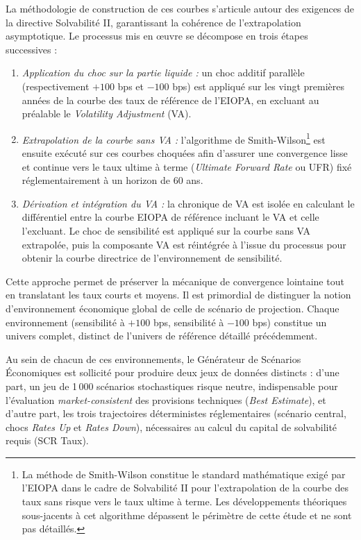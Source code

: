 La méthodologie de construction de ces courbes s'articule autour des exigences de la directive Solvabilité II, garantissant la cohérence de l'extrapolation asymptotique. Le processus mis en œuvre se décompose en trois étapes successives :
\begin{enumerate}
    \item \textit{Application du choc sur la partie liquide :} un choc additif parallèle (respectivement $+100$ bps et $-100$ bps) est appliqué sur les vingt premières années de la courbe des taux de référence de l'EIOPA, en excluant au préalable le \textit{Volatility Adjustment} (VA).
    \item \textit{Extrapolation de la courbe sans VA :} l'algorithme de Smith-Wilson\footnote{La méthode de Smith-Wilson constitue le standard mathématique exigé par l'EIOPA dans le cadre de Solvabilité II pour l'extrapolation de la courbe des taux sans risque vers le taux ultime à terme. Les développements théoriques sous-jacents à cet algorithme dépassent le périmètre de cette étude et ne sont pas détaillés.} est ensuite exécuté sur ces courbes choquées afin d'assurer une convergence lisse et continue vers le taux ultime à terme (\textit{Ultimate Forward Rate} ou UFR) fixé réglementairement à un horizon de 60 ans.
    \item \textit{Dérivation et intégration du VA :} la chronique de VA est isolée en calculant le différentiel entre la courbe EIOPA de référence incluant le VA et celle l'excluant. Le choc de sensibilité est appliqué sur la courbe sans VA extrapolée, puis la composante VA est réintégrée à l'issue du processus pour obtenir la courbe directrice de l'environnement de sensibilité.
\end{enumerate}

Cette approche permet de préserver la mécanique de convergence lointaine tout en translatant les taux courts et moyens. Il est primordial de distinguer la notion d'environnement économique global de celle de scénario de projection. Chaque environnement (sensibilité à $+100$ bps, sensibilité à $-100$ bps) constitue un univers complet, distinct de l'univers de référence détaillé précédemment.

Au sein de chacun de ces environnements, le Générateur de Scénarios Économiques est sollicité pour produire deux jeux de données distincts : d'une part, un jeu de 1\,000 scénarios stochastiques risque neutre, indispensable pour l'évaluation \textit{market-consistent} des provisions techniques (\textit{Best Estimate}), et d'autre part, les trois trajectoires déterministes réglementaires (scénario central, chocs \textit{Rates Up} et \textit{Rates Down}), nécessaires au calcul du capital de solvabilité requis (SCR Taux).

